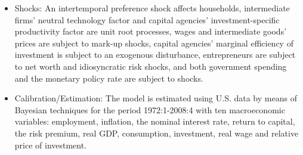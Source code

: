 \documentclass[11pt,a4paper]{article}
\begin{document}
\begin{itemize}
		\item Shocks: An intertemporal preference shock affects households, intermediate firms' neutral technology factor and capital agencies' investment-specific productivity factor are unit root processes, wages and intermediate goods' prices are subject to mark-up shocks, capital agencies' marginal efficiency of investment is subject to an exogenous disturbance, entrepreneurs are subject to net worth and idiosyncratic risk shocks, and both government spending and the monetary policy rate are subject to shocks.
		\item Calibration/Estimation: The model is estimated using U.S. data by means of Bayesian techniques for the period 1972:1-2008:4 with ten macroeconomic variables: employment, inflation, the nominal interest rate, return to capital, the risk premium, real GDP, consumption, investment, real wage and relative price of investment. 
	\end{itemize}
	
	
\end{document}
